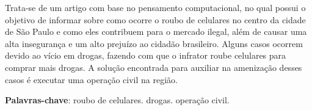 \documentclass[
	article,			
	12pt,				
	oneside,			
	a4paper,			
	english,			
	brazil,				
	sumario=tradicional
	]{abntex2}
\begin{document}
\frenchspacing 
\maketitle

\begin{resumoumacoluna}
    
    Trata-se de um artigo com base no pensamento computacional, no qual possui o objetivo de 
    informar sobre como ocorre o roubo de celulares no centro da cidade de São Paulo e como
    eles contribuem para o mercado ilegal, além de causar uma alta insegurança e um alto prejuízo ao
    cidadão brasileiro. Alguns casos ocorrem devido ao vício em drogas, fazendo com que o
    infrator roube celulares para comprar mais drogas. A solução encontrada para auxiliar na
    amenização desses casos é executar uma operação civil na região.
    
    \vspace{\onelineskip}
    
    \noindent
    \textbf{Palavras-chave}: roubo de celulares. drogas. operação civil.
\end{resumoumacoluna}

\textual

\newpage



\newpage



\newpage



\newpage



\newpage


\newpage

\end{document}
